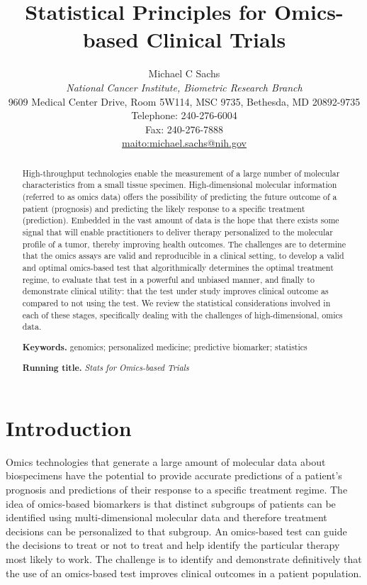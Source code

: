 \documentclass[11pt]{article}
\title{\bigskip \bigskip Statistical Principles for Omics-based Clinical Trials}
\author{\Large Michael C Sachs\vspace{0.05in} \\ \normalsize\emph{National Cancer Institute, Biometric Research Branch} \\ 
\footnotesize 9609 Medical Center Drive, Room 5W114, MSC 9735, Bethesda, MD 20892-9735 \\
\footnotesize Telephone: 240-276-6004 \\
\footnotesize Fax: 240-276-7888 \\
 \url{maito:michael.sachs@nih.gov}\vspace*{0.2in}\\ }
\begin{document}
  
		




\maketitle


\begin{abstract}

\noindent High-throughput technologies enable the measurement of a large number of
molecular characteristics from a small tissue specimen. High-dimensional
molecular information (referred to as omics data) offers the possibility
of predicting the future outcome of a patient (prognosis) and predicting
the likely response to a specific treatment (prediction). Embedded in
the vast amount of data is the hope that there exists some signal that
will enable practitioners to deliver therapy personalized to the
molecular profile of a tumor, thereby improving health outcomes. The
challenges are to determine that the omics assays are valid and
reproducible in a clinical setting, to develop a valid and optimal
omics-based test that algorithmically determines the optimal treatment
regime, to evaluate that test in a powerful and unbiased manner, and
finally to demonstrate clinical utility: that the test under study
improves clinical outcome as compared to not using the test. We review
the statistical considerations involved in each of these stages,
specifically dealing with the challenges of high-dimensional, omics
data.

\smallskip
\noindent \textbf{Keywords.} genomics; personalized medicine; predictive biomarker; statistics

\smallskip
\noindent \textbf{Running title.} \textit{Stats for Omics-based Trials}

\end{abstract}


\section{Introduction}\label{introduction}

Omics technologies that generate a large amount of molecular data about
biospecimens have the potential to provide accurate predictions of a
patient's prognosis and predictions of their response to a specific
treatment regime. The idea of omics-based biomarkers is that distinct
subgroups of patients can be identified using multi-dimensional
molecular data and therefore treatment decisions can be personalized to
that subgroup. An omics-based test can guide the decisions to treat or
not to treat and help identify the particular therapy most likely to
work. The challenge is to identify and demonstrate definitively that the
use of an omics-based test improves clinical outcomes in a patient
population.
\end{document}
